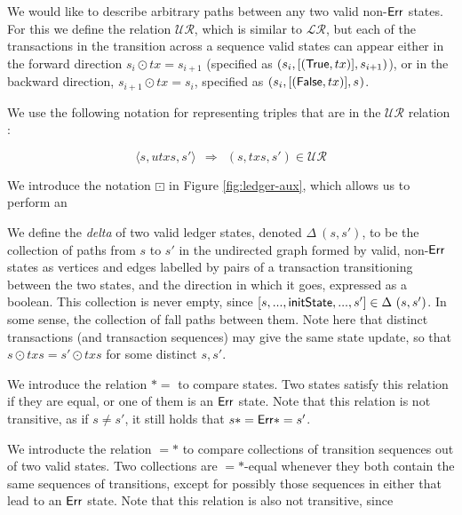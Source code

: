We would like to describe arbitrary paths between any two valid non-$\mathsf{Err}$ states.
For this we define the relation $\mathcal{UR}$, which is similar to $\mathcal{LR}$, but each
of the transactions in the transition across a sequence valid states can appear
either in the forward direction $s_i \odot tx = s_{i+1}$ (specified as $(s_i, [(\mathsf{True}, tx)], s_{i+1})$),
or in the backward direction, $s_{i+1} \odot tx = s_{i}$, specified as $(s_i, [(\mathsf{False}, tx)], s_{})$.

We use the following notation for representing triples that are in the $\mathcal{UR}$ relation :

\[ \langle s, utxs, s' \rangle ~~ \Rightarrow ~~(s, txs, s') \in  \mathcal{UR} \]

We introduce the notation $\boxdot$ in Figure \ref{fig:ledger-aux}, which allows us to
perform an

We define the \emph{delta} of two valid ledger states, denoted $\Delta~(s, s')$, to be the collection of paths
from $s$ to $s'$ in the undirected graph formed by valid, non-$\mathsf{Err}$ states as vertices and edges labelled
by pairs of a transaction transitioning between the two states, and the direction in which
it goes, expressed as a boolean.
This collection is never empty, since $[s, ..., \mathsf{initState},..., s'] \in \Delta~(s, s')$.
In some sense, the collection of fall paths between
them. Note here that distinct transactions (and transaction sequences)
may give the same state update, so that $s \odot txs = s' \odot txs$ for some distinct $s, s'$.

We introduce the relation $*=$ to compare states. Two states satisfy this relation
if they are equal, or one of them is an $\mathsf{Err}$ state. Note that this relation is
not transitive, as if $s \neq s'$, it still holds that $s *= \mathsf{Err} *= s'$.

We introducte the relation $=*$ to compare collections of transition sequences out of two
valid states. Two collections are $=*$-equal whenever they both contain the same
sequences of transitions, except for possibly those sequences in either that lead
to an $\mathsf{Err}$ state. Note that this relation is also not transitive, since


